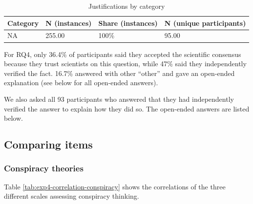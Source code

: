 \documentclass[
  doc,floatsintext]{apa6}
\begin{document}
\begin{table}[tbp]

\begin{center}
\begin{threeparttable}

\caption{\label{tab:exp4-justifications}Justifications by category}

\begin{tabular}{llll}
\toprule
Category & \multicolumn{1}{c}{N (instances)} & \multicolumn{1}{c}{Share (instances)} & \multicolumn{1}{c}{N (unique participants)}\\
\midrule
NA & 255.00 & 100\% & 95.00\\
\bottomrule
\end{tabular}

\end{threeparttable}
\end{center}

\end{table}

For RQ4, only 36.4\% of participants said they accepted the scientific consensus because they trust scientists on this question, while 47\% said they independently verified the fact. 16.7\% answered with other ``other'' and gave an open-ended explanation (see below for all open-ended answers).

We also asked all 93 participants who answered that they had independently verified the answer to explain how they did so. The open-ended answers are listed below.

\subsection{Comparing items}\label{comparing-items-3}

\subsubsection{Conspiracy theories}\label{conspiracy-theories-3}

Table \ref{tab:exp4-correlation-conspiracy} shows the correlations of the three different scales assessing conspiracy thinking.
\end{document}
